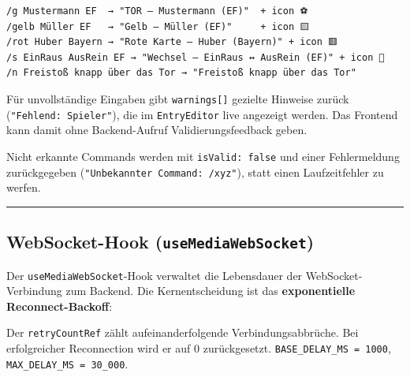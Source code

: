 \begin{verbatim}
/g Mustermann EF  → "TOR — Mustermann (EF)"  + icon ⚽
/gelb Müller EF   → "Gelb — Müller (EF)"     + icon 🟨
/rot Huber Bayern → "Rote Karte — Huber (Bayern)" + icon 🟥
/s EinRaus AusRein EF → "Wechsel — EinRaus ↔ AusRein (EF)" + icon 🔄
/n Freistoß knapp über das Tor → "Freistoß knapp über das Tor"
\end{verbatim}

Für unvollständige Eingaben gibt \texttt{warnings{[}{]}} gezielte
Hinweise zurück (\texttt{"Fehlend:\ Spieler"}), die im
\texttt{EntryEditor} live angezeigt werden. Das Frontend kann damit ohne
Backend-Aufruf Validierungsfeedback geben.

Nicht erkannte Commands werden mit \texttt{isValid:\ false} und einer
Fehlermeldung zurückgegeben (\texttt{"Unbekannter\ Command:\ /xyz"}),
statt einen Laufzeitfehler zu werfen.

\begin{center}\rule{0.5\linewidth}{0.5pt}\end{center}

\subsection{\texorpdfstring{WebSocket-Hook
(\texttt{useMediaWebSocket})}{WebSocket-Hook (useMediaWebSocket)}}\label{websocket-hook-usemediawebsocket}

Der \texttt{useMediaWebSocket}-Hook verwaltet die Lebensdauer der
WebSocket-Verbindung zum Backend. Die Kernentscheidung ist das
\textbf{exponentielle Reconnect-Backoff}:

\begin{Shaded}
\begin{Highlighting}[]
\OperatorTok{=} \NormalTok{(}
\OperatorTok{*}  \OperatorTok{**}\OperatorTok{,} 
\OperatorTok{,} 
\NormalTok{)}\OperatorTok{;}
\end{Highlighting}
\end{Shaded}

Der \texttt{retryCountRef} zählt aufeinanderfolgende
Verbindungsabbrüche. Bei erfolgreicher Reconnection wird er auf 0
zurückgesetzt. \texttt{BASE\_DELAY\_MS\ =\ 1000},
\texttt{MAX\_DELAY\_MS\ =\ 30\_000}.

